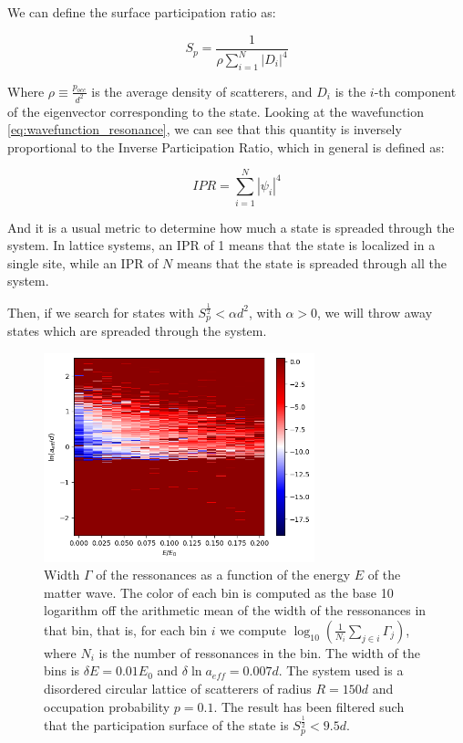 We can define the surface participation ratio as:

\begin{equation}
    S_p=\frac{1}{\rho \sum_{i=1}^N|D_i|^4}
\end{equation}

Where $\rho\equiv \frac{p_{occ}}{d^2}$ is the average density of scatterers, and $D_i$ is the $i$-th component of the eigenvector corresponding to the state. Looking at the wavefunction \cref{eq:wavefunction_resonance}, we can see that this quantity is inversely proportional to the Inverse Participation Ratio, which in general is defined as:

\begin{equation}
    IPR=\sum_{i=1}^N|\psi_i|^4
\end{equation}

And it is a usual metric to determine how much a state is spreaded through the system. In lattice systems, an IPR of 1 means that the state is localized in a single site, while an IPR of $N$ means that the state is spreaded through all the system.

Then, if we search for states with $S_p^{\frac{1}{2}}<\alpha d^2$, with $\alpha>0$, we will throw away states which are spreaded through the system.

\begin{figure}[ht]
    \centering
    \includegraphics[width=0.7\textwidth]{img/histogram.png}
    \caption{Width $\Gamma$ of the ressonances as a function of the energy $E$ of the matter wave. The color of each bin is computed as the base 10 logarithm off the arithmetic mean of the width of the ressonances in that bin, that is, for each bin $i$ we compute $\log_{10}\left(\frac{1}{N_i}\sum_{j\in i}\Gamma_j\right)$, where $N_i$ is the number of ressonances in the bin. The width of the bins is $\delta E=0.01E_0$ and $\delta \ln a_{eff}=0.007d$. The system used is a disordered circular lattice of scatterers of radius $R=150d$ and occupation probability $p=0.1$. The result has been filtered such that the participation surface of the state is $S_p^{\frac{1}{2}}<9.5d$.}
    \label{fig:loc_states}
\end{figure}

